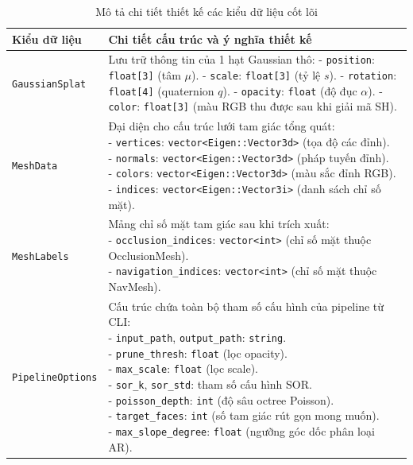 \documentclass[a4paper,12pt]{report}
\begin{document}
\begin{table}[H]
\centering
\small
\renewcommand{\arraystretch}{1.2}
\begin{tabularx}{\textwidth}{|l|X|}
\hline
\textbf{Kiểu dữ liệu} & \textbf{Chi tiết cấu trúc và ý nghĩa thiết kế} \\ \hline
\texttt{GaussianSplat} & 
\parbox[t]{\linewidth}{
Lưu trữ thông tin của 1 hạt Gaussian thô:\\
- \texttt{position}: \texttt{float[3]} (tâm $\mu$).\\
- \texttt{scale}: \texttt{float[3]} (tỷ lệ $s$).\\
- \texttt{rotation}: \texttt{float[4]} (quaternion $q$).\\
- \texttt{opacity}: \texttt{float} (độ đục $\alpha$).\\
- \texttt{color}: \texttt{float[3]} (màu RGB thu được sau khi giải mã SH).
} \\ \hline
\texttt{MeshData} & 
\parbox[t]{\linewidth}{
Đại diện cho cấu trúc lưới tam giác tổng quát:\\
- \texttt{vertices}: \texttt{vector<Eigen::Vector3d>} (tọa độ các đỉnh).\\
- \texttt{normals}: \texttt{vector<Eigen::Vector3d>} (pháp tuyến đỉnh).\\
- \texttt{colors}: \texttt{vector<Eigen::Vector3d>} (màu sắc đỉnh RGB).\\
- \texttt{indices}: \texttt{vector<Eigen::Vector3i>} (danh sách chỉ số mặt).
} \\ \hline
\texttt{MeshLabels} & 
\parbox[t]{\linewidth}{
Mảng chỉ số mặt tam giác sau khi trích xuất:\\
- \texttt{occlusion\_indices}: \texttt{vector<int>} (chỉ số mặt thuộc OcclusionMesh).\\
- \texttt{navigation\_indices}: \texttt{vector<int>} (chỉ số mặt thuộc NavMesh).
} \\ \hline
\texttt{PipelineOptions} & 
\parbox[t]{\linewidth}{
Cấu trúc chứa toàn bộ tham số cấu hình của pipeline từ CLI:\\
- \texttt{input\_path}, \texttt{output\_path}: \texttt{string}.\\
- \texttt{prune\_thresh}: \texttt{float} (lọc opacity).\\
- \texttt{max\_scale}: \texttt{float} (lọc scale).\\
- \texttt{sor\_k}, \texttt{sor\_std}: tham số cấu hình SOR.\\
- \texttt{poisson\_depth}: \texttt{int} (độ sâu octree Poisson).\\
- \texttt{target\_faces}: \texttt{int} (số tam giác rút gọn mong muốn).\\
- \texttt{max\_slope\_degree}: \texttt{float} (ngưỡng góc dốc phân loại AR).
} \\ \hline
\end{tabularx}
\caption{Mô tả chi tiết thiết kế các kiểu dữ liệu cốt lõi}
\label{tab:data_types}
\end{table}
\end{document}
